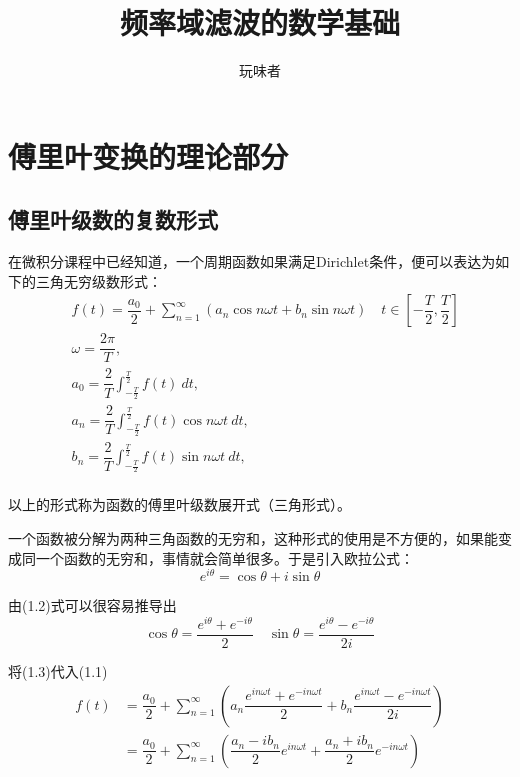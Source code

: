 \documentclass[UTF8]{ctexbook}
\title{频率域滤波的数学基础}
\author{玩味者}
\begin{document}
	\maketitle
	\tableofcontents
	\chapter{傅里叶变换的理论部分}
		\section{傅里叶级数的复数形式}
			在微积分课程中已经知道，一个周期函数如果满足Dirichlet条件，便可以表达为如下的三角无穷级数形式：
			\begin{equation}
				\begin{split}
					&f(t)=\dfrac{a_0}{2}+\sum_{n = 1}^\infty(a_n\cos n\omega t+b_n\sin n\omega t)\quad t\in [-\dfrac{T}{2}, \dfrac{T}{2}]\\
					&\omega= \dfrac{2\pi}{T},\\
					&a_0=\dfrac{2}{T}\int_{-\frac{T}{2}}^{\frac{T}{2}}f(t)\ dt,\\
					&a_n=\dfrac{2}{T}\int_{-\frac{T}{2}}^{\frac{T}{2}}f(t)\cos n\omega t\ dt,\\
					&b_n=\dfrac{2}{T}\int_{-\frac{T}{2}}^{\frac{T}{2}}f(t)\sin n\omega t\ dt,\\
				\end{split}
			\end{equation}

			以上的形式称为函数的傅里叶级数展开式（三角形式）。

			一个函数被分解为两种三角函数的无穷和，这种形式的使用是不方便的，如果能变成同一个函数的无穷和，事情就会简单很多。于是引入欧拉公式：
			\begin{equation}
				e^{i\theta}=\cos \theta +i \sin\theta
			\end{equation}

			由(1.2)式可以很容易推导出
			\begin{equation}
				\cos\theta =\dfrac{e^{i\theta}+e^{-i\theta}}{2}\quad \sin\theta = \dfrac{e^{i\theta}-e^{-i\theta}}{2i}
			\end{equation}

			将(1.3)代入(1.1)
			\begin{equation}
				\begin{split}
					f(t)&=\dfrac{a_0}{2}+\sum\limits_{n = 1}^\infty(a_n\dfrac{e^{in\omega t}+e^{-in\omega t}}{2}+b_n\dfrac{e^{in\omega t}-e^{-in\omega t}}{2i})\\
					&= \dfrac{a_0}{2}+\sum\limits_{n = 1}^\infty(\dfrac{a_n-i b_n}{2}e^{in\omega t}+\dfrac{a_n+i b_n}{2}e^{-in\omega t})
				\end{split}
			\end{equation}
			
\end{document}

